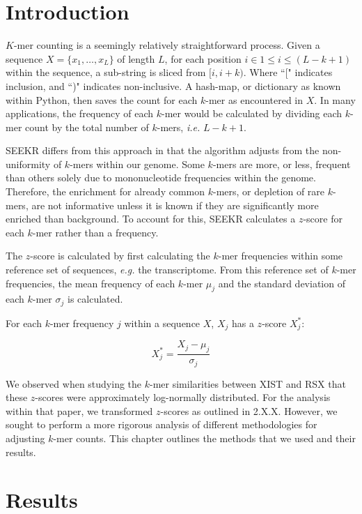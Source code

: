 \section{Introduction}
$K$-mer counting is a seemingly relatively straightforward process. Given a sequence $X = \{x_1,\dots,x_L\}$ of length $L$, for each position $i\in 1\leq i\leq \left(L-k+1\right)$ within the sequence, a sub-string is sliced from $[i,i+k)$. Where ``[" indicates inclusion, and ``)" indicates non-inclusive. A hash-map, or dictionary as known within Python, then saves the count for each $k$-mer as encountered in $X$. In many applications, the frequency of each $k$-mer would be calculated by dividing each $k$-mer count by the total number of $k$-mers, \emph{i.e.} $L-k+1$. 

SEEKR differs from this approach in that the algorithm adjusts from the non-uniformity of $k$-mers within our genome. Some $k$-mers are more, or less, frequent than others solely due to mononucleotide frequencies within the genome. Therefore, the enrichment for already common $k$-mers, or depletion of rare $k$-mers, are not informative unless it is known if they are significantly more enriched than background. To account for this, SEEKR calculates a $z$-score for each $k$-mer rather than a frequency.

The $z$-score is calculated by first calculating the $k$-mer frequencies within some reference set of sequences, \emph{e.g.} the transcriptome. From this reference set of $k$-mer frequencies, the mean frequency of each $k$-mer $\mu_j$ and the standard deviation of each $k$-mer $\sigma_j$ is calculated. 

For each $k$-mer frequency $j$ within a sequence $X$, $X_j$ has a $z$-score $X^*_j$: 

\begin{equation}
    X_j^* = \frac{X_j-\mu_j}{\sigma_j}
    \label{eq:zscore}
\end{equation}

We observed when studying the $k$-mer similarities between XIST and RSX that these $z$-scores were approximately log-normally distributed. For the analysis within that paper, we transformed $z$-scores as outlined in 2.X.X. However, we sought to perform a more rigorous analysis of different methodologies for adjusting $k$-mer counts. This chapter outlines the methods that we used and their results. 

\section{Results} 

